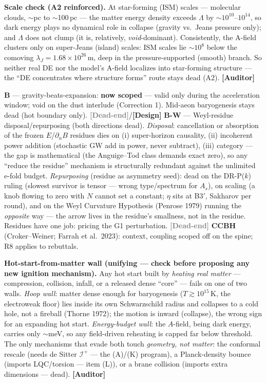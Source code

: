 \documentclass[11pt]{article}
\newcommand{\Auditor}{\textbf{\textcolor{teal!55!black}{[Auditor]}}}
\newcommand{\design}{\textcolor{blue!60!black}{\textbf{[Design]}}}
\newcommand{\dead}{\textcolor{gray}{\textbf{[Dead-end]}}}
\begin{document}
\textbf{Scale check (A2 reinforced).} At star-forming (ISM) scales --- molecular clouds, $\sim$pc to $\sim$100\,pc --- the matter energy density exceeds $\Lambda$ by $\sim\!10^{10}$--$10^{14}$, so dark energy plays no dynamical role in collapse (gravity vs.\ Jeans pressure only); and $\Lambda$ does not clump (it is, relatively, \emph{void}-dominant). Consistently, the A-field clusters only on super-Jeans (island) scales: ISM scales lie $\sim\!10^{8}$ below the comoving $\lambda_J=1.68\times10^{26}$\,m, deep in the pressure-supported (smooth) branch. So neither real DE nor the model's A-field localizes into star-forming structure --- the ``DE concentrates where structure forms'' route stays dead (A2). \Auditor

\textbf{B} --- gravity-beats-expansion: \textbf{now scoped} --- valid only during the acceleration window; void on the dust interlude (Correction 1). Mid-aeon baryogenesis stays dead (hot boundary only). \dead/\design\quad
\textbf{B-W} --- Weyl-residue disposal/repurposing (both directions dead). \emph{Disposal}: cancellation or absorption of the frozen $E$/$\partial_n B$ residues dies on (i) super-horizon causality, (ii) incoherent power addition (stochastic GW add in power, never subtract), (iii) category --- the gap is mathematical (the Anguige--Tod class demands exact zero), so any ``reduce the residue'' mechanism is structurally redundant against the unlimited e-fold budget. \emph{Repurposing} (residue as asymmetry seed): dead on the DR-P($k$) ruling (slowest survivor is tensor --- wrong type/spectrum for $A_s$), on scaling (a knob flowing to zero with $N$ cannot set a constant; $\eta$ sits at B3$'$, Sakharov per round), and on the Weyl Curvature Hypothesis (Penrose 1979) running the \emph{opposite} way --- the arrow lives in the residue's smallness, not in the residue. Residues have one job: pricing the G1 perturbation. \dead\quad
\textbf{CCBH} (Croker--Weiner; Farrah et al.\ 2023): context, coupling scoped off on the spine; R8 applies to rebuttals.

\medskip\noindent\textbf{Hot-start-from-matter wall (unifying --- check before proposing any new ignition mechanism).} Any hot start built by \emph{heating real matter} --- compression, collision, infall, or a released dense ``core'' --- fails on one of two walls. \emph{Hoop wall}: matter dense enough for baryogenesis ($T\gtrsim10^{15}$\,K, the electroweak floor) lies inside its own Schwarzschild radius and collapses to a cold hole, not a fireball (Thorne 1972); the motion is inward (collapse), the wrong sign for an expanding hot start. \emph{Energy-budget wall}: the $A$-field, being dark energy, carries only $\sim$meV, so any field-driven reheating is capped far below threshold. The only mechanisms that evade both touch \emph{geometry, not matter}: the conformal rescale (needs de Sitter $\mathscr I^+$ --- the (A)/(K) program), a Planck-density bounce (imports LQC/torsion --- item (L)), or a brane collision (imports extra dimensions --- dead). \Auditor
\end{document}
